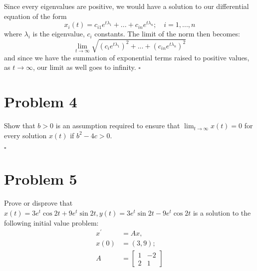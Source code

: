 \documentclass[11pt]{article}
\newenvironment{proof}{\noindent{\bf Proof.}}{\hfill $\square$\medskip}
\begin{document}
\begin{proof}
Since every eigenvalues are positive, we would have a solution to our differential equation of 
the form
$$x_{i}(t)=c_{i1}e^{t\lambda_{1}}+...+c_{in}e^{t\lambda_{n}};\quad i=1,...,n$$
where $\lambda_{i}$ is the eigenvalue, $c_{i}$ constants. The limit of the norm then becomes:
$$\lim_{t\to\infty}\sqrt{(c_{i}e^{t\lambda_{1}})^{2}+...+(c_{in}e^{t\lambda_{n}})^{2}}$$
and since we have the summation of exponential terms raised to positive values, 
as $t\rightarrow\infty$, our limit as well goes to infinity.
\end{proof}

\section{Problem 4}
Show that $b>0$ is an assumption required to ensure that $\lim_{t\to\infty}x(t)=0$
for every solution $x(t)$ if $b^{2}-4c>0$.

\begin{proof}

\end{proof}

\section{Problem 5}
Prove or disprove that $x(t)=3e^{t}\cos2t+9e^{t}\sin2t,y(t)=3e^{t}\sin2t-9e^{t}\cos2t$
is a solution to the following initial value problem:
\begin{equation}
    \begin{split}
        x^{\prime}&=Ax,\\
        x(0)&=(3,9);\\
        A&=\begin{bmatrix}
            1 & -2 \\
            2 & 1
        \end{bmatrix}
    \end{split}
\end{equation}
\end{document}
